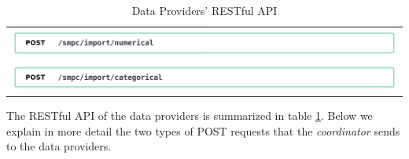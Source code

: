 \begin{table}[H]
  \centering
  \caption{Data Providers' RESTful API}
  \label{t:data-providers-api}
\begin{tabular}{l}
  \includegraphics[page=1,width=\textwidth]{figures/post4.pdf} \\
  \includegraphics[page=1,width=\textwidth]{figures/post5.pdf} \\
\end{tabular}
\end{table}


The RESTful API of the data providers is summarized in table \ref{t:data-providers-api}.
Below we explain in more detail the two types of POST requests that the \textit{coordinator} sends to the data providers.


